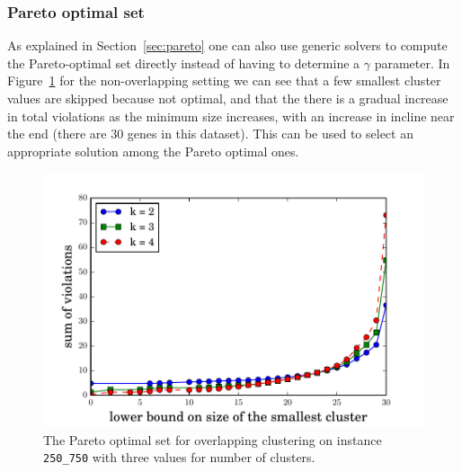 \documentclass[conference]{IEEEtran}
\begin{document}
\subsubsection{Pareto optimal set}
As explained in Section~\ref{sec:pareto} one can also use generic solvers to compute the Pareto-optimal set directly instead of having to determine a $\gamma$ parameter. In Figure~\ref{fig:pareto} for the non-overlapping setting we can see that a few smallest cluster values are skipped because not optimal, and that the there is a gradual increase in total violations as the minimum size increases, with an increase in incline near the end (there are 30 genes in this dataset). This can be used to select an appropriate solution among the Pareto optimal ones.

\begin{figure}
\centering
\includegraphics[scale=0.5]{images/pareto}
\captionsetup{font=small}
\caption{The Pareto optimal set for overlapping clustering on instance \texttt{250\_750} with three values for number of clusters.}
\label{fig:pareto}
\end{figure}
\end{document}
